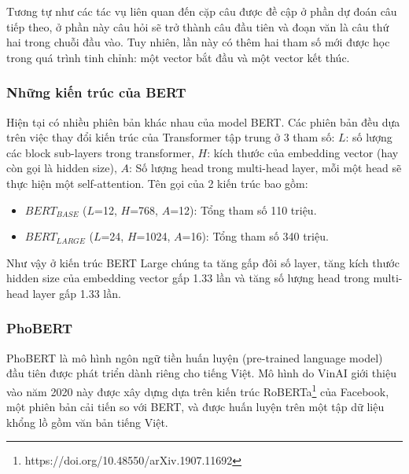 Tương tự như các tác vụ liên quan đến cặp câu được đề cập ở phần dự đoán câu tiếp theo, ở phần này câu hỏi sẽ trở thành câu đầu tiên và đoạn văn là câu thứ hai trong chuỗi đầu vào. Tuy nhiên, lần này có thêm hai tham số mới được học trong quá trình tinh chỉnh: một vector bắt đầu và một vector kết thúc.

\subsubsection{Những kiến trúc của BERT}
Hiện tại có nhiều phiên bản khác nhau của model BERT. Các phiên bản đều dựa trên việc thay đổi kiến trúc của Transformer tập trung ở 3 tham số: $L$: số lượng các block sub-layers trong transformer, $H$: kích thước của embedding vector (hay còn gọi là hidden size), $A$: Số lượng head trong multi-head layer, mỗi một head sẽ thực hiện một self-attention. Tên gọi của 2 kiến trúc bao gồm:
\begin{itemize}
    \item $BERT_{BASE}$ ($L$=12, $H$=768, $A$=12): Tổng tham số 110 triệu.
    \item $BERT_{LARGE}$ ($L$=24, $H$=1024, $A$=16): Tổng tham số 340 triệu.
\end{itemize}
Như vậy ở kiến trúc BERT Large chúng ta tăng gấp đôi số layer, tăng kích thước hidden size của embedding vector gấp 1.33 lần và tăng số lượng head trong multi-head layer gấp 1.33 lần.

\subsubsection{PhoBERT}

PhoBERT là mô hình ngôn ngữ tiền huấn luyện (pre-trained language model) đầu tiên được phát triển dành riêng cho tiếng Việt. Mô hình do VinAI giới thiệu vào năm 2020 này được xây dựng dựa trên kiến trúc RoBERTa\footnote{https://doi.org/10.48550/arXiv.1907.11692} của Facebook, một phiên bản cải tiến so với BERT, và được huấn luyện trên một tập dữ liệu khổng lồ gồm văn bản tiếng Việt\cite{webpage21}.

